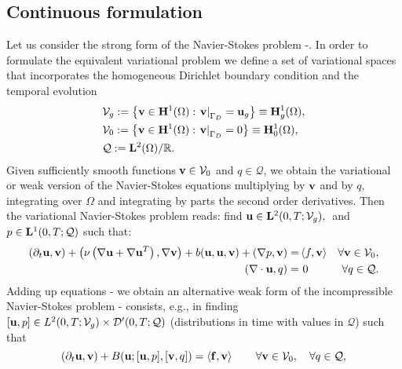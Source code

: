 \subsection{Continuous formulation}
\label{subsec-variational_continuous}
Let us consider the strong form of the Navier-Stokes problem -. In order to formulate the equivalent variational problem we define a set of variational spaces that incorporates the homogeneous Dirichlet boundary condition and the temporal evolution
\begin{align}
\label{eq-C2_varia_NS_u_space}
&\mathcal{V}_g:=\left\{{\bf v}\in{\bf H}^1(\Omega):\left.{\bf v}\right|_{\Gamma_D}={\bf u}_g\right\}\equiv{\bf H}^1_g(\Omega),\\
\label{eq-C2_varia_NS_v_space}
&\mathcal{V}_0:=\left\{{\bf v}\in{\bf H}^1(\Omega):\left.{\bf v}\right|_{\Gamma_D}=0\right\}\equiv{\bf H}^1_0(\Omega),\\
\label{eq-C2_varia_NS_p_space}
&\mathcal{Q}:={\bf L}^2(\Omega)/\mathbb{R}.
\end{align}
Given sufficiently smooth functions $ {\bf v}\in\mathcal{V}_0 $ and $ q\in\mathcal{Q} $, we obtain the variational or weak version of the Navier-Stokes equations multiplying  by $ {\bf v} $  and  by $ q $, integrating over $ \Omega $ and integrating by parts the second order derivatives. Then the variational Navier-Stokes problem reads: find $ {\bf u}\in{\bf L}^2(0,T;\mathcal{V}_g),\\ $ and $ p\in{\bf L}^1(0,T;\mathcal{Q}) $ such that: 
\begin{align}
\label{eq-C2_varia_NS_weak_momentum}
(\partial_t{\bf u},{\bf v})+\left(\nu\left(\nabla{\bf u}+\nabla{\bf u}^T\right),\nabla{\bf v}\right)+b({\bf u},{\bf u},{\bf v})+(\nabla p,{\bf v})=&\left\langle f,{\bf v}\right\rangle&\forall{\bf v}\in\mathcal{V}_0,\\
\label{eq-C2_varia_NS_weak_continuity}
(\nabla\cdot{\bf u},q)=&\ 0&\forall q\in\mathcal{Q}.
\end{align}
Adding up equations - we obtain an alternative weak form of the incompressible Navier-Stokes problem - consists, e.g., in finding $[{\bf u},p]\in {L}^2(0,T;\mathcal{V}_g)\times {\cal D}'(0,T;\mathcal{Q})$ (distributions in time with values in $\mathcal{Q}$) such that
\begin{equation}
\label{eq-C2_NS_weak}
(\partial_t{\bf u},{\bf v}) + B({\bf u};[{\bf u},p],[{\bf v},q]) = \left<{\bf f},{\bf v}\right> 
\quad\quad\forall{\bf v}\in\mathcal{V}_0,\quad\forall q\in\mathcal{Q},
\end{equation}
